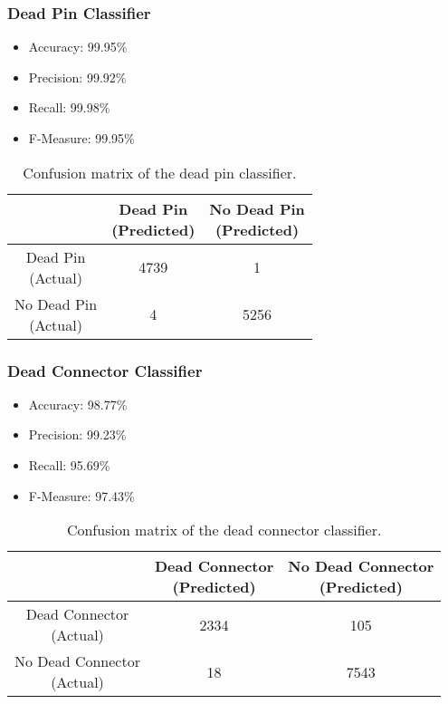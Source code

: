 \begin{frame}
  \frametitle{Dead Pin Classifier}
  \begin{itemize}
  \item Accuracy: 99.95\%
  \item Precision: 99.92\%
  \item Recall: 99.98\%
  \item F-Measure: 99.95\%
\end{itemize}
\begin{table}[h]
  \centering
  \renewcommand\theadfont{\bfseries}
  \begin{tabular}{|c|c|c|}
    \hline
    & \thead{Dead Pin\\(Predicted)} & \thead{No Dead Pin\\(Predicted)} \\
    \hline
    \thead{Dead Pin\\(Actual)} & 4739 & 1\\
    \hline
    \thead{No Dead Pin\\(Actual)} & 4 & 5256\\
    \hline
  \end{tabular}
  \caption{Confusion matrix of the dead pin classifier.}
\end{table}
\end{frame}

\begin{frame}
  \frametitle{Dead Connector Classifier}
  \begin{itemize}
  \item Accuracy: 98.77\%
  \item Precision: 99.23\%
  \item Recall: 95.69\%
  \item F-Measure: 97.43\%
\end{itemize}
\begin{table}[h]
  \centering
  \renewcommand\theadfont{\bfseries}
  \begin{tabular}{|c|c|c|}
    \hline
    & \thead{Dead Connector\\(Predicted)} & \thead{No Dead Connector\\(Predicted)} \\
    \hline
    \thead{Dead Connector\\(Actual)} & 2334 & 105\\
    \hline
    \thead{No Dead Connector\\(Actual)} & 18 & 7543\\
    \hline
  \end{tabular}
  \caption{Confusion matrix of the dead connector classifier.}
\end{table}
\end{frame}

